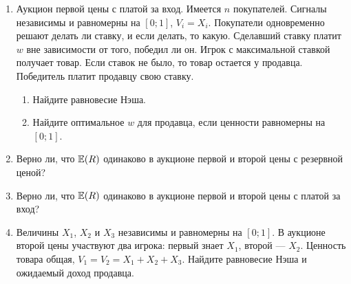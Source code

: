 \begin{enumerate}
\item Аукцион первой цены с платой за вход. Имеется $ n $ покупателей.  Сигналы независимы и равномерны на $ [0;1] $, $ V_{i}=X_{i} $. Покупатели одновременно решают делать ли ставку, и если делать, то какую. Сделавший ставку платит $ w $ вне зависимости от того, победил ли он. Игрок с максимальной ставкой получает товар. Если ставок не было, то товар остается у продавца. Победитель платит продавцу свою ставку.
\begin{enumerate}
\item Найдите равновесие Нэша. 
\item Найдите оптимальное $ w $ для продавца, если ценности равномерны на $ [0;1] $.
\end{enumerate}

\item Верно ли, что $ \mathbb{E}(R) $ одинаково в аукционе первой и второй цены с резервной ценой?

\item Верно ли, что $ \mathbb{E}(R) $ одинаково в аукционе первой и второй цены с платой за вход?

\item Величины $ X_{1} $, $ X_{2} $ и $ X_{3} $ независимы и равномерны на $ [0;1] $. В аукционе второй цены участвуют два игрока: первый знает $ X_{1} $, второй --- $ X_{2} $. Ценность товара общая, $ V_{1}=V_{2}=X_{1}+X_{2}+X_{3} $. Найдите равновесие Нэша и ожидаемый доход продавца.


\end{enumerate}
